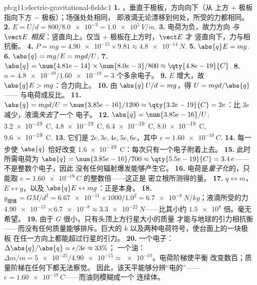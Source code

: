 \begin{solution}{pb:g11:electric-gravitational-fields:1}
\textbf{1.} ，垂直于极板，方向向下（从
上方 $+$ 极板指向下方 $-$ 极板）；场强处处相同，
即液滴无论漂移到何处，所受的力都相同。
\textbf{2.} $E = U/d = 800 / \num{8.0e-3} = \qty{1.0e5}{V/m}$.
\textbf{3.} 电荷为负，故力方向
\emph{与 $\vect E$ 相反}：竖直向上。仅当 $+$ 极板在上方时，$\vect E$ 才
竖直向下，力与相抗衡。
\textbf{4.} $P = mg = \num{4.90e-15} \times 9.81 \approx
\qty{4.8e-14}{N}$.
\textbf{5.} $\abs{q}E = mg$.
\textbf{6.} $\abs{q} = mg/E = mgd/U$.
\textbf{7.} $\abs{q} = \num{4.81e-14} \times \num{8.0e-3} / 800
\approx \qty{4.8e-19}{C}$.
\textbf{8.} $n = \num{4.8e-19} / \num{1.60e-19} = 3$ 个多余电子。
\textbf{9.} $E$ 增大，故 $\abs{q}E > mg$：合力向上。
\textbf{10.} 由 $\abs{q}\,U/d = mg$，得 $U = mgd/\abs{q}$——
与电荷成反比。
\textbf{11.} $\abs{q} = mgd/U = \num{3.85e-16}/1200 \approx
\qty{3.2e-19}{C} = 2e$：比 $3e$ 减少，液滴\emph{失去}了一个
电子。
\textbf{12.} $\abs{q} = \num{3.85e-16}/U$: \qty{3.2e-19}{C},
\qty{4.8e-19}{C}, \qty{6.4e-19}{C}, \qty{8.0e-19}{C},
\qty{9.6e-19}{C}.
\textbf{13.} 它们是 $2e, 3e, 4e, 5e, 6e$，其中
$e = \qty{1.60e-19}{C}$.
\textbf{14.} 每一步使 $\abs{q}$ 恰好改变
\qty{1.6e-19}{C}：每次只有一个电子附着上去。
\textbf{15.} 此时所需电荷为 $\abs{q} = \num{3.85e-16}/700 \approx
\qty{5.5e-19}{C} = 3.4\,e$——不是整数个电子，因此
没有任何辐射爆发能够产生它。
\textbf{16.} 电荷是\emph{量子化}的，只能取
 $e = \qty{1.60e-19}{C}$ 的整数倍——这正是
密立根所测得的量。
\textbf{17.} $q \leftrightarrow m$，$E \leftrightarrow g$，以及
$\abs{q}E \leftrightarrow mg$：正是本身。
\textbf{18.} $g_{\text{球体}} = GM/d^2 = \num{6.67e-11} \times 1000 /
1.0^2 = \qty{6.7e-8}{N/kg}$；液滴所受的力
$\num{4.90e-15} \times \num{6.7e-8} \approx \qty{3.3e-22}{N}$——比其小约
$\num{1.5e8}$ 倍。毫无希望。
\textbf{19.} 由于 $G$ 很小，只有头顶上方行星大小的质量
才能与地球的引力相抗衡——而没有任何质量能够排斥。巨大的 $k$
以及两种电荷符号，使台面上的一块极板
在任一方向上都能超过行星的引力。
\textbf{20.} 一个电子：$\Delta\abs{q}/\abs{q} = e/3e \approx 33\%$；
一个油：$\Delta m/m = \num{5e-25} / \num{4.90e-15}
\approx \num{e-10}$。电荷阶梯使平衡
改变数百；质量阶梯在任何下都无法察觉。
因此，该天平能够分辨“电的”——
$e = \qty{1.60e-19}{C}$——而油则模糊成一个
连续体。
\end{solution}
